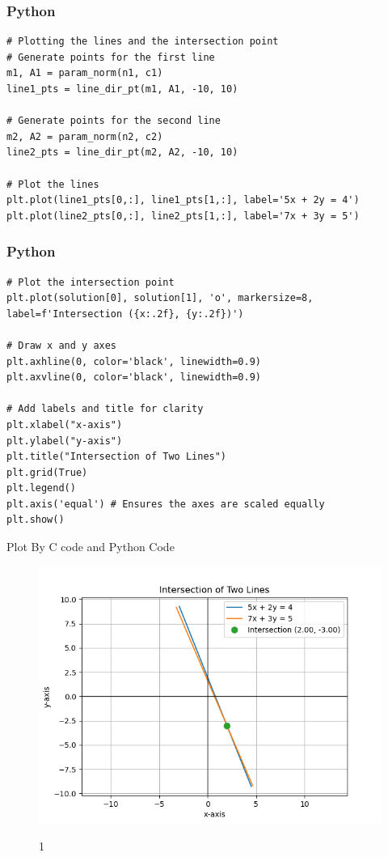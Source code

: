 \documentclass{beamer}
\begin{document}
\begin{frame}[fragile]
\frametitle{Python}
\begin{lstlisting}
# Plotting the lines and the intersection point
# Generate points for the first line
m1, A1 = param_norm(n1, c1)
line1_pts = line_dir_pt(m1, A1, -10, 10)

# Generate points for the second line
m2, A2 = param_norm(n2, c2)
line2_pts = line_dir_pt(m2, A2, -10, 10)

# Plot the lines
plt.plot(line1_pts[0,:], line1_pts[1,:], label='5x + 2y = 4')
plt.plot(line2_pts[0,:], line2_pts[1,:], label='7x + 3y = 5')
\end{lstlisting}
\end{frame}
\begin{frame}[fragile]
\frametitle{Python}
\begin{lstlisting}
# Plot the intersection point
plt.plot(solution[0], solution[1], 'o', markersize=8, label=f'Intersection ({x:.2f}, {y:.2f})')

# Draw x and y axes
plt.axhline(0, color='black', linewidth=0.9)
plt.axvline(0, color='black', linewidth=0.9)

# Add labels and title for clarity
plt.xlabel("x-axis")
plt.ylabel("y-axis")
plt.title("Intersection of Two Lines")
plt.grid(True)
plt.legend()
plt.axis('equal') # Ensures the axes are scaled equally
plt.show()

\end{lstlisting}
\end{frame}
\begin{frame}{Plot By C code and Python Code}
    \begin{figure}
    \centering
    \includegraphics[width=0.7\columnwidth]{figs/Figure_1.png}
    \label{fig:placeholder}
    \caption{1}
\end{figure}
\end{frame}
\end{document}
